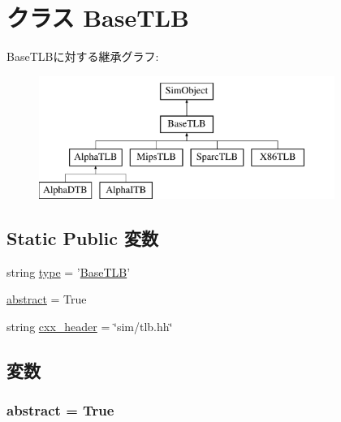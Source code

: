\hypertarget{classBaseTLB_1_1BaseTLB}{
\section{クラス BaseTLB}
\label{classBaseTLB_1_1BaseTLB}
}
BaseTLBに対する継承グラフ:\begin{figure}[H]
\begin{center}
\leavevmode
\includegraphics[height=4cm]{classBaseTLB_1_1BaseTLB}
\end{center}
\end{figure}
\subsection*{Static Public 変数}
\begin{DoxyCompactItemize}
\item 
string \hyperlink{classBaseTLB_1_1BaseTLB_acce15679d830831b0bbe8ebc2a60b2ca}{type} = '\hyperlink{classBaseTLB_1_1BaseTLB}{BaseTLB}'
\item 
\hyperlink{classBaseTLB_1_1BaseTLB_a17fa61ac3806b481cafee5593b55e5d0}{abstract} = True
\item 
string \hyperlink{classBaseTLB_1_1BaseTLB_a17da7064bc5c518791f0c891eff05fda}{cxx\_\-header} = \char`\"{}sim/tlb.hh\char`\"{}
\end{DoxyCompactItemize}


\subsection{変数}
\hypertarget{classBaseTLB_1_1BaseTLB_a17fa61ac3806b481cafee5593b55e5d0}{
\subsubsection[{abstract}]{\setlength{\rightskip}{0pt plus 5cm}abstract = True}}
\label{classBaseTLB_1_1BaseTLB_a17fa61ac3806b481cafee5593b55e5d0}


